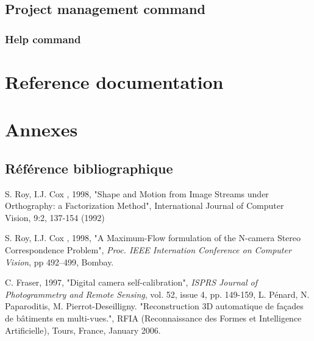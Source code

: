\documentclass[a4paper]{book}
\begin{document}

\chapter{Project management command}

\section{Help command}

\label{HelpCmd}




\part{Reference documentation}




\part{Annexes}

\appendix

\chapter{R\'ef\'erence bibliographique}


\begin{thebibliography}{AAA}
      S. Roy, I.J. Cox , 1998, "Shape and Motion from Image 
            Streams under Orthography: a Factorization Method", International Journal of Computer Vision, 
            9:2, 137-154 (1992)


      S. Roy, I.J. Cox , 1998, "A Maximum-Flow
            formulation of the N-camera Stereo Correspondence
      Problem", \emph{Proc. IEEE Internation Conference on
      Computer Vision}, pp 492--499, Bombay.

     C. Fraser, 1997, "Digital camera self-calibration",
   \emph{ISPRS Journal of Photogrammetry and Remote Sensing}, vol. 52, issue 4, pp. 149-159,
      L. Pénard, N. Paparoditis, M. Pierrot-Deseilligny.
           "Reconstruction 3D automatique de façades de bâtiments en multi-vues.",
            RFIA (Reconnaissance des Formes et Intelligence Artificielle),
            Tours, France, January 2006.
\end{thebibliography}


\printindex
\end{document}
